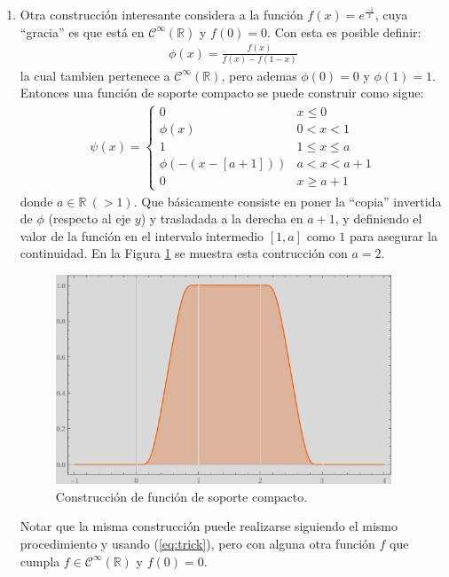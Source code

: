 \documentclass[spanish, fleqn]{article}
\begin{document}
\begin{description}
\begin{enumerate}
	\item Otra construcción interesante considera a la función $\displaystyle f(x) = e^{\frac{-1}{x}}$, cuya ``gracia'' es que está en $\mathcal{C}^{\infty}(\mathbb{R})$ y $f(0)=0$. Con esta es posible definir:
	\begin{align}
		\phi(x) = \frac{f(x)}{f(x)-f(1-x)}
	\label{eq:trick}
	\end{align}
	la cual tambien pertenece a $\mathcal{C}^{\infty}(\mathbb{R})$, pero ademas $\phi(0)=0$ y $\phi(1)=1$. Entonces una función de soporte compacto se puede construir como sigue:
	\begin{align*}
		\psi(x) =
		\begin{cases}
		0 & x \leq 0 \\
		\phi(x) & 0 < x <1 \\
		1 & 1 \leq x \leq a \\
		\phi(-(x-[a+1])) & a < x < a+1 \\
		0 & x \geq a+1
		\end{cases}	
	\end{align*}
	donde $a \in \mathbb{R}\ (> 1)$. Que básicamente consiste en poner la ``copia'' invertida de $\phi$ (respecto al eje $y$) y trasladada a la derecha en $a+1$, y definiendo el valor de la función en el intervalo intermedio $[1,a]$ como $1$ para asegurar la continuidad. En la Figura \ref{fig:const} se muestra esta contrucción con $a=2$.
	\begin{figure}[htpb!]
	\centering
	\includegraphics[width=10cm]{construction}
	\caption{Construcción de función de soporte compacto.}
	\label{fig:const}
	\end{figure}
	
	Notar que la misma construcción puede realizarse siguiendo el mismo procedimiento y usando (\ref{eq:trick}), pero con
	alguna otra función $f$ que cumpla $f \in \mathcal{C}^{\infty}(\mathbb{R})$ y $f(0)=0$.

	\end{enumerate}


\end{description}
\end{document}
